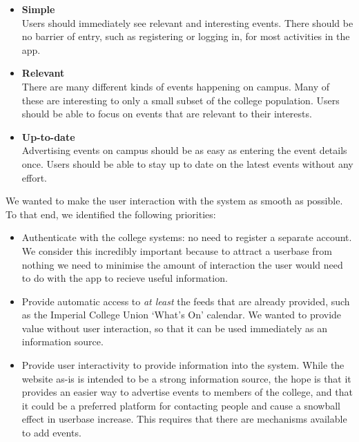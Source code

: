 \documentclass[11pt]{article}
\begin{document}
\begin{itemize}
    \item \textbf{Simple} \\[0.5em] Users should immediately see relevant and interesting events. There should be no barrier of entry, such as registering or logging in, for most activities in the app.

    \item \textbf{Relevant} \\[0.5em] There are many different kinds of events happening on campus. Many of these are interesting to only a small subset of the college population. Users should be able to focus on events that are relevant to their interests.

    \item \textbf{Up-to-date} \\[0.5em] Advertising events on campus should be as easy as entering the event details once. Users should be able to stay up to date on the latest events without any effort.

\end{itemize}

We wanted to make the user interaction with the system as smooth as possible. To that end, we identified the following priorities:

\begin{itemize}
\item Authenticate with the college systems: no need to register a separate account. We consider this incredibly important because to attract a userbase from nothing we need to minimise the amount of interaction the user would need to do with the app to recieve useful information.

\item Provide automatic access to \textit{at least} the feeds that are already provided, such as the Imperial College Union `What's On' calendar. We wanted to provide value without user interaction, so that it can be used immediately as an information source.

\item Provide user interactivity to provide information into the system. While the website as-is is intended to be a strong information source, the hope is that it provides an easier way to advertise events to members of the college, and that it could be a preferred platform for contacting people and cause a snowball effect in userbase increase. This requires that there are mechanisms available to add events.
\end{itemize}
\end{document}
